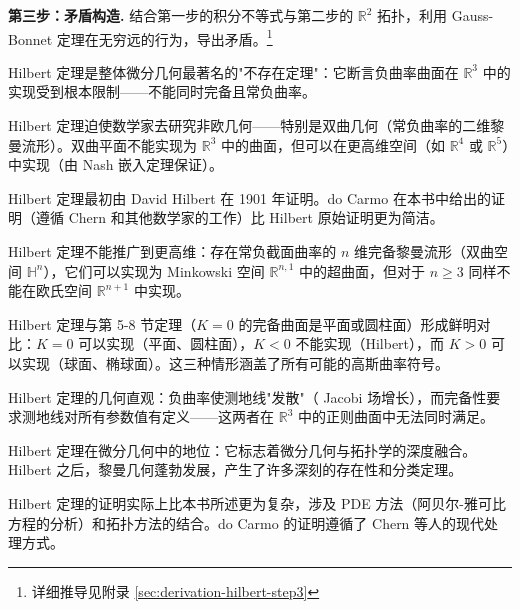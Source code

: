 \begin{Remark}
\textbf{第三步：矛盾构造.} 结合第一步的积分不等式与第二步的 $\mathbb{R}^2$ 拓扑，利用 Gauss-Bonnet 定理在无穷远的行为，导出矛盾。\footnote{详细推导见附录 \cref{sec:derivation-hilbert-step3}}

\begin{Remark}
Hilbert 定理是整体微分几何最著名的"不存在定理"：它断言负曲率曲面在 $\mathbb{R}^3$ 中的实现受到根本限制——不能同时完备且常负曲率。
\end{Remark}

\begin{Remark}
Hilbert 定理迫使数学家去研究非欧几何——特别是双曲几何（常负曲率的二维黎曼流形）。双曲平面不能实现为 $\mathbb{R}^3$ 中的曲面，但可以在更高维空间（如 $\mathbb{R}^4$ 或 $\mathbb{R}^5$）中实现（由 Nash 嵌入定理保证）。
\end{Remark}

\begin{Remark}
Hilbert 定理最初由 David Hilbert 在 1901 年证明。do Carmo 在本书中给出的证明（遵循 Chern 和其他数学家的工作）比 Hilbert 原始证明更为简洁。
\end{Remark}

\begin{Remark}
Hilbert 定理不能推广到更高维：存在常负截面曲率的 $n$ 维完备黎曼流形（双曲空间 $\mathbb{H}^n$），它们可以实现为 Minkowski 空间 $\mathbb{R}^{n,1}$ 中的超曲面，但对于 $n \geq 3$ 同样不能在欧氏空间 $\mathbb{R}^{n+1}$ 中实现。
\end{Remark}

\begin{Remark}
Hilbert 定理与第 5-8 节定理（$K=0$ 的完备曲面是平面或圆柱面）形成鲜明对比：$K=0$ 可以实现（平面、圆柱面），$K<0$ 不能实现（Hilbert），而 $K>0$ 可以实现（球面、椭球面）。这三种情形涵盖了所有可能的高斯曲率符号。
\end{Remark}

\begin{Remark}
Hilbert 定理的几何直观：负曲率使测地线"发散"（ Jacobi 场增长），而完备性要求测地线对所有参数值有定义——这两者在 $\mathbb{R}^3$ 中的正则曲面中无法同时满足。
\end{Remark}

\begin{Remark}
Hilbert 定理在微分几何中的地位：它标志着微分几何与拓扑学的深度融合。Hilbert 之后，黎曼几何蓬勃发展，产生了许多深刻的存在性和分类定理。
\end{Remark}

\begin{Remark}
Hilbert 定理的证明实际上比本书所述更为复杂，涉及 PDE 方法（阿贝尔-雅可比方程的分析）和拓扑方法的结合。do Carmo 的证明遵循了 Chern 等人的现代处理方式。
\end{Remark}


\end{Remark}
